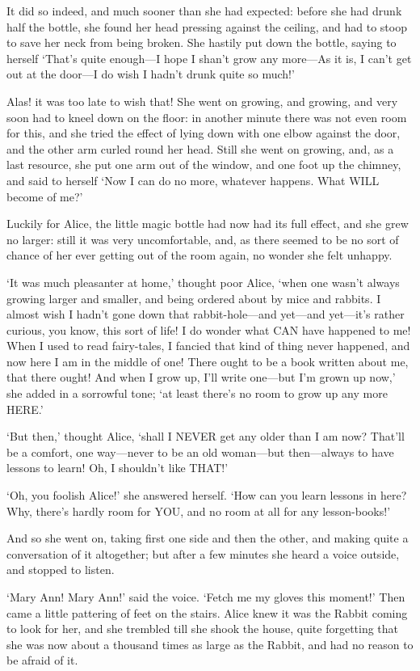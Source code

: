 \documentclass[12pt]{book}
\begin{document}
\begin{Parallel}[p]{}{}
{It did so indeed, and much sooner than she had expected: before she had drunk half the bottle, she found her head pressing against the ceiling, and had to stoop to save her neck from being broken. She hastily put down the bottle, saying to herself ‘That’s quite enough—I hope I shan’t grow any more—As it is, I can’t get out at the door—I do wish I hadn’t drunk quite so much!’

Alas! it was too late to wish that! She went on growing, and growing, and very soon had to kneel down on the floor: in another minute there was not even room for this, and she tried the effect of lying down with one elbow against the door, and the other arm curled round her head. Still she went on growing, and, as a last resource, she put one arm out of the window, and one foot up the chimney, and said to herself ‘Now I can do no more, whatever happens. What WILL become of me?’

Luckily for Alice, the little magic bottle had now had its full effect, and she grew no larger: still it was very uncomfortable, and, as there seemed to be no sort of chance of her ever getting out of the room again, no wonder she felt unhappy.

‘It was much pleasanter at home,’ thought poor Alice, ‘when one wasn’t always growing larger and smaller, and being ordered about by mice and rabbits. I almost wish I hadn’t gone down that rabbit-hole—and yet—and yet—it’s rather curious, you know, this sort of life! I do wonder what CAN have happened to me! When I used to read fairy-tales, I fancied that kind of thing never happened, and now here I am in the middle of one! There ought to be a book written about me, that there ought! And when I grow up, I’ll write one—but I’m grown up now,’ she added in a sorrowful tone; ‘at least there’s no room to grow up any more HERE.’

‘But then,’ thought Alice, ‘shall I NEVER get any older than I am now? That’ll be a comfort, one way—never to be an old woman—but then—always to have lessons to learn! Oh, I shouldn’t like THAT!’

‘Oh, you foolish Alice!’ she answered herself. ‘How can you learn lessons in here? Why, there’s hardly room for YOU, and no room at all for any lesson-books!’

And so she went on, taking first one side and then the other, and making quite a conversation of it altogether; but after a few minutes she heard a voice outside, and stopped to listen.

‘Mary Ann! Mary Ann!’ said the voice. ‘Fetch me my gloves this moment!’ Then came a little pattering of feet on the stairs. Alice knew it was the Rabbit coming to look for her, and she trembled till she shook the house, quite forgetting that she was now about a thousand times as large as the Rabbit, and had no reason to be afraid of it.

}
\end{Parallel}
\end{document}
